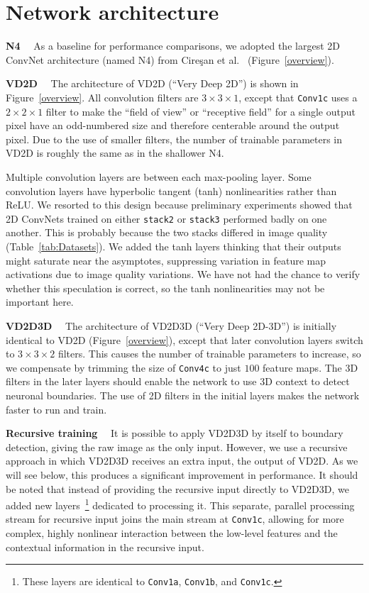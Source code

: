\documentclass{article} %
\begin{document}
\section{Network architecture}

{\bf N4}$\quad$
As a baseline for performance comparisons, we adopted the largest 2D ConvNet architecture (named N4) from Cire\c{s}an et al.~\cite{Ciresan2012} (Figure~\ref{overview}).

{\bf VD2D}$\quad$
The architecture of VD2D (``Very Deep 2D'') is shown in
Figure~\ref{overview}.  All convolution filters are $3\times3\times1$, except that
\texttt{Conv1c} uses a $2\times2\times1$ filter to make the ``field of view'' or ``receptive field'' for a single output pixel have an odd-numbered size and therefore centerable around the output pixel.  Due to the use of smaller filters, the number of trainable parameters in VD2D is roughly the same as in the shallower N4.

Multiple convolution layers are between each max-pooling layer. Some
convolution layers have hyperbolic tangent (tanh) nonlinearities rather than ReLU. We
resorted to this design because preliminary experiments showed that 2D
ConvNets trained on either \texttt{stack2} or \texttt{stack3}
performed badly on one another.  This is probably because the two
stacks differed in image quality (Table~\ref{tab:Datasets}).  We added the
tanh layers thinking that their outputs might saturate near the asymptotes,
suppressing variation in feature map activations due to image quality
variations. We have not had the chance to verify whether this
speculation is correct, so the tanh nonlinearities may not be
important here.

{\bf VD2D3D}$\quad$
The architecture of VD2D3D (``Very Deep 2D-3D'') is initially identical to VD2D (Figure~\ref{overview}), except that later convolution layers switch to $3\times 3\times 2$ filters. This causes the number of trainable parameters to increase, so we compensate by trimming the size of \texttt{Conv4c} to just $100$ feature maps.  The 3D filters in the later layers should enable the network to use 3D context to detect neuronal boundaries.  The use of 2D filters in the initial layers makes the network faster to run and train.

{\bf Recursive training}$\quad$
It is possible to apply VD2D3D by itself to boundary detection, giving
the raw image as the only input. However, we use a recursive approach
in which VD2D3D receives an extra input, the output of VD2D. As we will see below, this produces a significant improvement in performance. It should be noted that instead of providing the recursive input directly to VD2D3D, we added new layers~\footnote{These layers are identical to \texttt{Conv1a}, \texttt{Conv1b}, and \texttt{Conv1c}.} dedicated to processing it. This separate, parallel processing stream for recursive input joins the main stream at \texttt{Conv1c}, allowing for more complex, highly nonlinear interaction between the low-level features and the contextual information in the recursive input.
\end{document}
